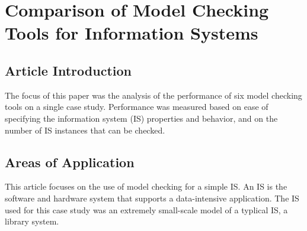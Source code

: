 \documentclass[conference]{IEEEtran}
\begin{document}
\section{Comparison of Model Checking Tools for Information Systems}

\subsection{Article Introduction}
The focus of this paper was the analysis of the performance of six model checking tools on a single case study. Performance was measured based on ease of specifying the information system (IS) properties and behavior, and on the number of IS instances that can be checked. 

\subsection{Areas of Application}
This article focuses on the use of model checking for a simple IS. An IS is the software and hardware system that supports a data-intensive application. The IS used for this case study was an extremely small-scale model of a typlical IS, a library system.
\end{document}
